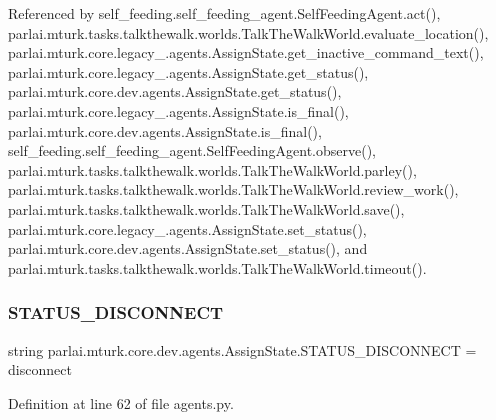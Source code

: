Referenced by self\+\_\+feeding.\+self\+\_\+feeding\+\_\+agent.\+Self\+Feeding\+Agent.\+act(), parlai.\+mturk.\+tasks.\+talkthewalk.\+worlds.\+Talk\+The\+Walk\+World.\+evaluate\+\_\+location(), parlai.\+mturk.\+core.\+legacy\+\_.\+agents.\+Assign\+State.\+get\+\_\+inactive\+\_\+command\+\_\+text(), parlai.\+mturk.\+core.\+legacy\+\_.\+agents.\+Assign\+State.\+get\+\_\+status(), parlai.\+mturk.\+core.\+dev.\+agents.\+Assign\+State.\+get\+\_\+status(), parlai.\+mturk.\+core.\+legacy\+\_.\+agents.\+Assign\+State.\+is\+\_\+final(), parlai.\+mturk.\+core.\+dev.\+agents.\+Assign\+State.\+is\+\_\+final(), self\+\_\+feeding.\+self\+\_\+feeding\+\_\+agent.\+Self\+Feeding\+Agent.\+observe(), parlai.\+mturk.\+tasks.\+talkthewalk.\+worlds.\+Talk\+The\+Walk\+World.\+parley(), parlai.\+mturk.\+tasks.\+talkthewalk.\+worlds.\+Talk\+The\+Walk\+World.\+review\+\_\+work(), parlai.\+mturk.\+tasks.\+talkthewalk.\+worlds.\+Talk\+The\+Walk\+World.\+save(), parlai.\+mturk.\+core.\+legacy\+\_.\+agents.\+Assign\+State.\+set\+\_\+status(), parlai.\+mturk.\+core.\+dev.\+agents.\+Assign\+State.\+set\+\_\+status(), and parlai.\+mturk.\+tasks.\+talkthewalk.\+worlds.\+Talk\+The\+Walk\+World.\+timeout().

\mbox{\label{classparlai_1_1mturk_1_1core_1_1dev_1_1agents_1_1AssignState_a1a015796330e6430c736038476dd1097}} 
\subsubsection{\texorpdfstring{S\+T\+A\+T\+U\+S\+\_\+\+D\+I\+S\+C\+O\+N\+N\+E\+CT}{STATUS\_DISCONNECT}}
{\footnotesize\ttfamily string parlai.\+mturk.\+core.\+dev.\+agents.\+Assign\+State.\+S\+T\+A\+T\+U\+S\+\_\+\+D\+I\+S\+C\+O\+N\+N\+E\+CT = \textquotesingle{}disconnect\textquotesingle{}\hspace{0.3cm}{\ttfamily [static]}}



Definition at line 62 of file agents.\+py.



